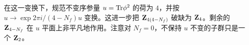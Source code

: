 


在这一变换下，规范不变序参量 $u={\rm
Tr}\phi^2$ 的荷为 $4$，并按 $u \rightarrow \exp 2 \pi
i /(4-N_f) u$ 变换。这进一步把 ${\bf Z}_{4(4-N_f)}$ 破缺为 ${\bf
Z}_4$。剩余的 ${\bf Z}_{4-N_f}$ 在 $u$ 平面上非平凡地作用。注意对
$N_f=0$，不保持 $u$ 不变的子群只是一个 ${\bf Z}_2$。

